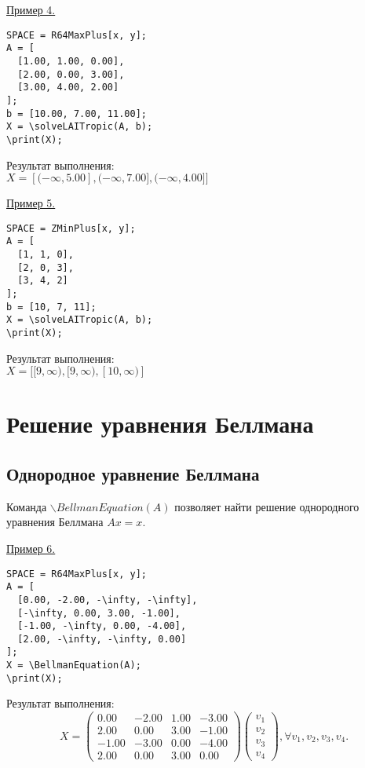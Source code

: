 \smallskip

\underline{Пример 4. }

\vspace*{-3mm}
\begin{verbatim}
SPACE = R64MaxPlus[x, y];
A = [
  [1.00, 1.00, 0.00],
  [2.00, 0.00, 3.00],
  [3.00, 4.00, 2.00]
];
b = [10.00, 7.00, 11.00]; 
X = \solveLAITropic(A, b); 
\print(X);
\end{verbatim}

Результат выполнения:\\
$X=[(-\infty,5.00],(-\infty,7.00],(-\infty,4.00]]$ 

\smallskip

\underline{Пример 5. }

\vspace*{-3mm}
\begin{verbatim}
SPACE = ZMinPlus[x, y];
A = [
  [1, 1, 0],
  [2, 0, 3],
  [3, 4, 2]
];
b = [10, 7, 11];
X = \solveLAITropic(A, b); 
\print(X);
\end{verbatim}

Результат выполнения:\\
$X=[[9,\infty),[9,\infty),[10,\infty)]$ 

\section{Решение  уравнения Беллмана}
\subsection{Однородное уравнение Беллмана}
Команда $\backslash BellmanEquation(A)$ позволяет найти решение однородного уравнения Беллмана $Ax = x$.
\smallskip

\underline{Пример 6.}

\vspace*{-3mm}
\begin{verbatim}
SPACE = R64MaxPlus[x, y];
A = [
  [0.00, -2.00, -\infty, -\infty],
  [-\infty, 0.00, 3.00, -1.00],
  [-1.00, -\infty, 0.00, -4.00],
  [2.00, -\infty, -\infty, 0.00]
]; 
X = \BellmanEquation(A); 
\print(X);
\end{verbatim}

Результат выполнения:\\
$$
X=\left(\begin{array}{cccc}
0.00 & -2.00 & 1.00 & -3.00\\
2.00 & 0.00 & 3.00 & -1.00\\
-1.00 & -3.00 & 0.00 & -4.00\\
2.00 & 0.00 & 3.00 & 0.00
\end{array}\right) \left(\begin{array}{c}
v_{1}\\
v_{2}\\
v_{3}\\
v_{4}
\end{array}\right), \forall v_{1}, v_{2}, v_{3}, v_{4}.$$
